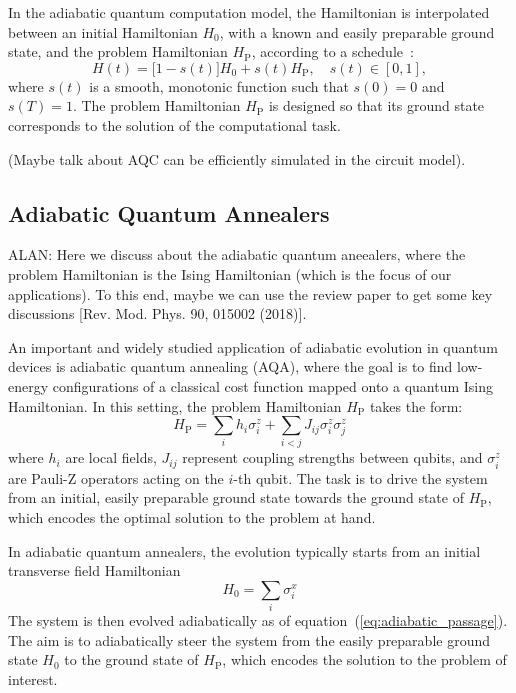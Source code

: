 In the adiabatic quantum computation model, the Hamiltonian is interpolated between an
initial Hamiltonian $H_0$, with a known and easily preparable ground state, and the problem
Hamiltonian $H_\mathrm{P}$, according to a schedule~\cite{albash_adiabatic_2018}:
\begin{equation}
    H(t) = \big[1 - s(t)\big] H_0 + s(t) H_\mathrm{P}, \quad s(t) \in [0,1],
    \label{eq:adiabatic_passage}
\end{equation}
where $s(t)$ is a smooth, monotonic function such that $s(0)=0$ and $s(T)=1$. The problem
Hamiltonian $H_\mathrm{P}$ is designed so that its ground state corresponds to the solution
of the computational task.

(Maybe talk about AQC can be efficiently simulated in the circuit model).

\subsection{Adiabatic Quantum Annealers}

{\color{blue}ALAN: Here we discuss about the adiabatic quantum aneealers, where the problem Hamiltonian
is the Ising Hamiltonian (which is the focus of our applications). To this end, maybe we can use the
review paper to get some key discussions [Rev. Mod. Phys. 90, 015002 (2018)].}

An important and widely studied application of adiabatic evolution in quantum
devices is adiabatic quantum annealing (AQA), where the goal is to find low-energy configurations of
a classical cost function mapped onto a quantum Ising Hamiltonian. In this setting, the problem
Hamiltonian $H_\mathrm{P}$ takes the form:
\begin{equation}
    H_\mathrm{P} = \sum_i h_i \sigma_i^z + \sum_{i<j} J_{ij} \sigma_i^z \sigma_j^z
    \label{eq:ising_hamiltonian}
\end{equation}
where $h_i$ are local fields, $J_{ij}$ represent coupling strengths between qubits, and
$\sigma_i^z$ are Pauli-Z operators acting on the $i$-th qubit. The task is to drive the system
from an initial, easily preparable ground state towards the ground state of $H_\mathrm{P}$,
which encodes the optimal solution to the problem at hand.

In adiabatic quantum annealers, the evolution typically starts from an initial transverse
field Hamiltonian 
\begin{equation}
    H_0 = \sum_i \sigma_i^x
    \label{eq:transverse_field_hamiltonian}
\end{equation}
The system is then evolved adiabatically as of equation~(\ref{eq:adiabatic_passage}). The aim
is to adiabatically steer the system from the easily preparable ground state $H_0$ to the
ground state of $H_\mathrm{P}$, which encodes the solution to the problem of interest.



